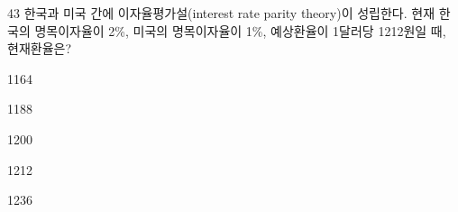 \begin{question}{43}
한국과 미국 간에 이자율평가설(interest rate parity theory)이 성립한다. 현재 한국의 명목이자율이 2\%, 미국의 명목이자율이 1\%, 예상환율이 1달러당 1212원일 때, 현재환율은?
\begin{choices}
  \item 1164
  \item 1188
  \item 1200
  \item 1212
  \item 1236
\end{choices}
\end{question}
